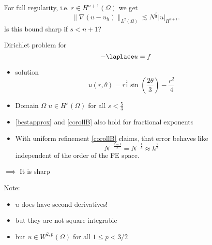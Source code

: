 For full regularity, i.e. $r \in H^{n+1}(\Omega)$ we get 
\begin{equation*}
	\|\nabla(u-u_{h})\|_{L^{2}(\Omega)} \lesssim N^{\frac{r}{d}} |u|_{H^{n+1}}.
\end{equation*}
Is this bound sharp if $s < n+1$?
\begin{example}
	Dirichlet problem for 
	\begin{equation*}
		- \laplace u = f
	\end{equation*}
	\begin{itemize}
		\item solution
			\begin{equation*}
				u(r,\theta) = r^{\frac{2}{3}} \sin(\frac{2\theta}{3}) - \frac{r^2}{4}
			\end{equation*}
		\item Domain $\Omega$
			$u \in H^s(\Omega)$ for all $s < \frac{5}{3}$ 
		\item \eqref{bestapprox} and \eqref{corollB} also hold for fractional exponents
		\item With uniform refinement \eqref{corollB} claims, that error behaves like
			\begin{equation*}
				N^{-\frac{s-1}{d}} = N^{-\frac{1}{3}} \approx h^{\frac{2}{3}}
			\end{equation*}
			independent of the order of the FE space.
	\end{itemize}
	$\implies$ It is sharp\nl

	Note: 
	\begin{itemize}
		\item $u$ does have second derivatives!
		\item but they are not square integrable
		\item but $u \in W^{2,p}(\Omega)$ for all $1\leq p < 3/2$
	\end{itemize}
	
\end{example}


